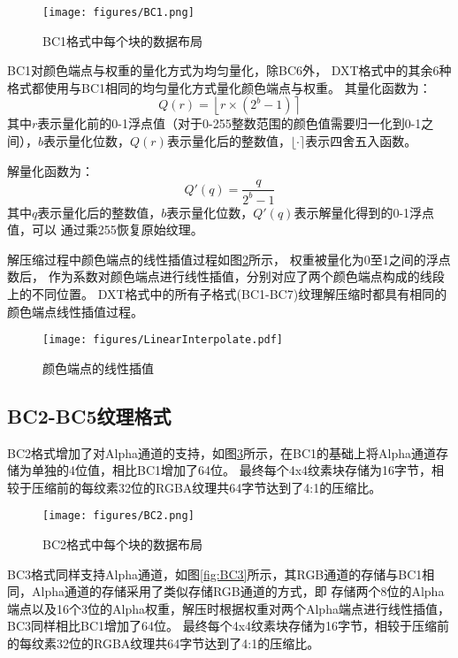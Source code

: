 \begin{figure}[htbp]
    \centering
    \texttt{[image: figures/BC1.png]}
    \caption{BC1格式中每个块的数据布局\cite{BC1-5}}
    \label{fig:BC1}
\end{figure}

BC1对颜色端点与权重的量化方式为均匀量化，除BC6外，
DXT格式中的其余6种格式都使用与BC1相同的均匀量化方式量化颜色端点与权重。
其量化函数为：
\begin{equation}\label{eqn-6}
    Q(r)=\left \lfloor r \times (2^{b}-1) \right \rceil
\end{equation}
其中$r$表示量化前的0-1浮点值（对于0-255整数范围的颜色值需要归一化到0-1之间），$b$表示量化位数，$Q(r)$表示量化后的整数值，$\lfloor \cdot \rceil$表示四舍五入函数。

解量化函数为：
\begin{equation}\label{eqn-6}
    Q'(q)=\frac{q}{2^{b}-1}
\end{equation}
其中$q$表示量化后的整数值，$b$表示量化位数，$Q'(q)$表示解量化得到的0-1浮点值，可以
通过乘255恢复原始纹理。

解压缩过程中颜色端点的线性插值过程如图\ref{fig:LinearInterpolate}所示，
权重被量化为0至1之间的浮点数后，
作为系数对颜色端点进行线性插值，分别对应了两个颜色端点构成的线段上的不同位置。
DXT格式中的所有子格式(BC1-BC7)纹理解压缩时都具有相同的颜色端点线性插值过程。

\begin{figure}[htbp]
    \centering
    \texttt{[image: figures/LinearInterpolate.pdf]}
    \caption{颜色端点的线性插值\cite{ASTC}}
    \label{fig:LinearInterpolate}
\end{figure}

\subsection{BC2-BC5纹理格式}
BC2格式增加了对Alpha通道的支持，如图\ref{fig:BC2}所示，在BC1的基础上将Alpha通道存储为单独的4位值，相比BC1增加了64位。
最终每个4x4纹素块存储为16字节，相较于压缩前的每纹素32位的RGBA纹理共64字节达到了4:1的压缩比。

\begin{figure}[htbp]
    \centering
    \texttt{[image: figures/BC2.png]}
    \caption{BC2格式中每个块的数据布局\cite{BC1-5}}
    \label{fig:BC2}
\end{figure}    

BC3格式同样支持Alpha通道，如图\ref{fig:BC3}所示，其RGB通道的存储与BC1相同，Alpha通道的存储采用了类似存储RGB通道的方式，即
存储两个8位的Alpha 端点以及16个3位的Alpha权重，解压时根据权重对两个Alpha端点进行线性插值，BC3同样相比BC1增加了64位。
最终每个4x4纹素块存储为16字节，相较于压缩前的每纹素32位的RGBA纹理共64字节达到了4:1的压缩比。

